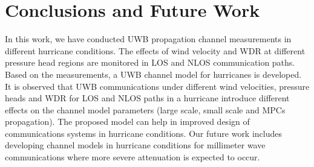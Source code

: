 \documentclass[conference]{IEEEtran}
\begin{document}






\section{Conclusions and Future Work}
In this work, we have conducted UWB propagation channel measurements in different hurricane conditions. The effects of wind velocity and WDR at different pressure head regions are monitored in LOS and NLOS communication paths. Based on the measurements, a UWB channel model for hurricanes is developed. It is observed that UWB communications under different wind velocities, pressure heads and WDR for LOS and NLOS paths in a hurricane introduce different effects on the channel model parameters (large scale, small scale and MPCs propagation). The proposed model can help in improved design of communications systems in hurricane conditions. Our future work includes developing channel models in hurricane conditions for millimeter wave communications where more severe attenuation is expected to occur.      

 

%
\end{document}
